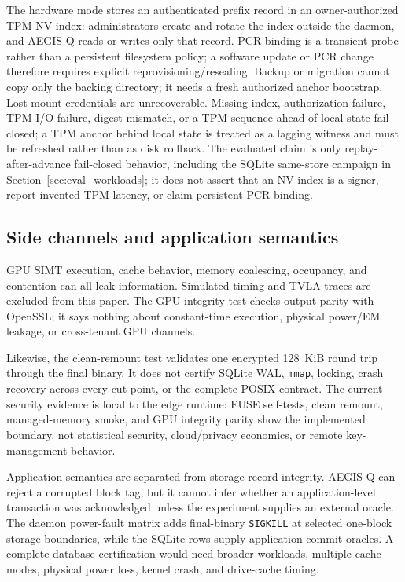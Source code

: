 The hardware mode stores an authenticated prefix record in an owner-authorized TPM NV index: administrators create and rotate the index outside the daemon, and AEGIS-Q reads or writes only that record.  PCR binding is a transient probe rather than a persistent filesystem policy; a software update or PCR change therefore requires explicit reprovisioning/resealing.  Backup or migration cannot copy only the backing directory; it needs a fresh authorized anchor bootstrap.  Lost mount credentials are unrecoverable.  Missing index, authorization failure, TPM I/O failure, digest mismatch, or a TPM sequence ahead of local state fail closed; a TPM anchor behind local state is treated as a lagging witness and must be refreshed rather than as disk rollback.  The evaluated claim is only replay-after-advance fail-closed behavior, including the SQLite same-store campaign in Section~\ref{sec:eval_workloads}; it does not assert that an NV index is a signer, report invented TPM latency, or claim persistent PCR binding.

\subsection{Side channels and application semantics}
\label{sec:case_impl}

GPU SIMT execution, cache behavior, memory coalescing, occupancy, and contention can all leak information.  Simulated timing and TVLA traces are excluded from this paper.  The GPU integrity test checks output parity with OpenSSL; it says nothing about constant-time execution, physical power/EM leakage, or cross-tenant GPU channels.

Likewise, the clean-remount test validates one encrypted 128~KiB round trip through the final binary.  It does not certify SQLite WAL, \texttt{mmap}, locking, crash recovery across every cut point, or the complete POSIX contract.  The current security evidence is local to the edge runtime: FUSE self-tests, clean remount, managed-memory smoke, and GPU integrity parity show the implemented boundary, not statistical security, cloud/privacy economics, or remote key-management behavior.

Application semantics are separated from storage-record integrity.  AEGIS-Q can reject a corrupted block tag, but it cannot infer whether an application-level transaction was acknowledged unless the experiment supplies an external oracle.  The daemon power-fault matrix adds final-binary \texttt{SIGKILL} at selected one-block storage boundaries, while the SQLite rows supply application commit oracles.  A complete database certification would need broader workloads, multiple cache modes, physical power loss, kernel crash, and drive-cache timing.
